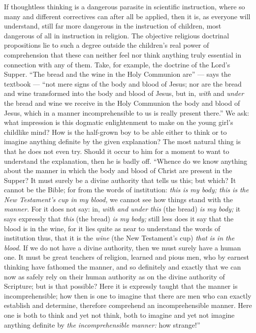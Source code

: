 \documentclass[12pt,a4paper,openany]{book}
\newcommand{\opage}[1]{\marginnote{\footnotesize\textit{[#1]}}}
\begin{document}
If thoughtless thinking is a dangerous parasite
in scientific instruction, where so many and different correctives
can after all be applied, then it is,
as everyone will understand, still far more dangerous in
the instruction of children, most dangerous of all in instruction in
religion. The objective religious doctrinal propositions lie to such
a degree outside the children's real power of comprehension that these
can neither feel nor think anything truly essential
in connection with any of them. Take, for example, the doctrine of the Lord's Supper.
``The bread and the wine in the Holy Communion are''
--- says the textbook --- ``not mere signs of the body
and blood of Jesus; nor are the bread and wine transformed
into the body and blood of Jesus, but in, \emph{with} and \emph{under} the bread
and wine we receive in the Holy Communion the
\setcounter{footnote}{0}%
\opage{318}body and blood of Jesus, which in a manner incomprehensible to us
is really present there.'' We ask: what impression
is this dogmatic enlightenment to make on the young
girl's childlike mind? How is the half-grown
boy to be able either to think or to imagine
anything definite by the given explanation? The most natural thing
is that he does not even try.
Should it occur to him for a moment to want to understand
the explanation, then he is badly off. ``Whence do we know
anything about the manner in which the body and
blood of Christ are present in the Supper? It must surely be a
divine authority that tells us this; but which?
It cannot be the Bible; for from the words of institution:
\emph{this is my body; this is the New Testament's
cup in my blood,} we cannot see how
things stand with the \emph{manner.} For it does not
say: in, \emph{with and under this} (the bread) \emph{is my body;}
it says expressly that \emph{this} (the bread) \emph{is}
\emph{my body;} still less does it say that the blood is in
the wine, for it lies quite as near to understand the words of institution
thus, that it is the \emph{wine} (the New Testament's
cup) \emph{that is in the blood.} If we do not have a
divine authority, then we must surely have a human one.
It must be great teachers of religion, learned and
pious men, who by earnest thinking have fathomed
the manner, and so definitely and exactly that we can now
as safely rely on their human authority
as on the divine authority of Scripture; but is that
possible? Here it is expressly taught that the manner is incomprehensible;
how then is one to imagine that there are
men who can exactly establish and determine,
\setcounter{footnote}{0}%
\opage{319}therefore comprehend an incomprehensible manner. Here one is both
to think and yet not think, both to imagine and yet
not imagine anything definite by \emph{the incomprehensible}
\emph{manner:} how strange!''
\end{document}
